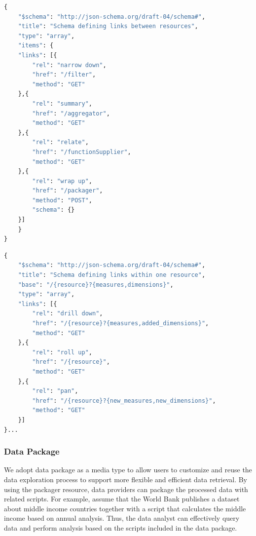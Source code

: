 \documentclass[10pt, conference, compsocconf]{IEEEtran}
\begin{document}
\begin{lstlisting}[language=python, caption=HyperSchema of Links for Dynamical Discovery]
{
	"$schema": "http://json-schema.org/draft-04/schema#",
	"title": "Schema defining links between resources",
	"type": "array",
	"items": {
	"links": [{
		"rel": "narrow down",
		"href": "/filter",
		"method": "GET"
	},{
		"rel": "summary",
		"href": "/aggregator",
		"method": "GET"
	},{
		"rel": "relate",
		"href": "/functionSupplier",
		"method": "GET"
	},{
		"rel": "wrap up",
		"href": "/packager",
		"method": "POST",
		"schema": {}
	}]
	}
}
\end{lstlisting}
\begin{lstlisting}[language=Python, caption=HyperSchema of Links for Dynamical Generation]
{
	"$schema": "http://json-schema.org/draft-04/schema#",
	"title": "Schema defining links within one resource",
	"base": "/{resource}?{measures,dimensions}",
	"type": "array",
	"links": [{
		"rel": "drill down",
		"href": "/{resource}?{measures,added_dimensions}",
		"method": "GET"
	},{
		"rel": "roll up",
		"href": "/{resource}",
		"method": "GET"
	},{
		"rel": "pan",
		"href": "/{resource}?{new_measures,new_dimensions}",
		"method": "GET"
	}]
}...
\end{lstlisting}

\subsubsection{Data Package}
We adopt data package as a media type to allow users to customize and reuse the data exploration process to support more flexible and efficient data retrieval. By using the packager resource, data providers can package the processed data with related scripts. For example, assume that the World Bank publishes a dataset about middle income countries together with a script that calculates the middle income based on annual analysis. Thus, the data analyst can effectively query data and perform analysis based on the scripts included in the data package. 
\end{document}
